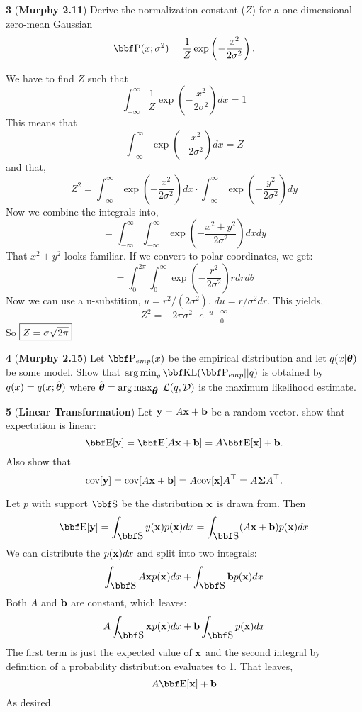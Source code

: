 \documentclass[12pt,letterpaper,fleqn]{hmcpset}
\begin{document}
\newpage

\textbf{3} (\textbf{Murphy 2.11}) Derive the normalization constant ($Z$) for a one dimensional
zero-mean Gaussian
\[
    \PP(x; \sigma^2) = \frac{1}{Z}\exp\left(-\frac{x^2}{2\sigma^2}\right).
\]

\begin{solution}
	We have to find $Z$ such that
	$$\int_{-\infty}^{\infty}\frac{1}{Z}\exp\left(-\frac{x^2}{2\sigma^2}\right)dx = 1$$
	This means that
	$$\int_{-\infty}^{\infty}\exp\left(-\frac{x^2}{2\sigma^2}\right)dx = Z$$
	and that, 
	$$ Z^2 = \int_{-\infty}^{\infty}\exp\left(-\frac{x^2}{2\sigma^2}\right)dx \cdot \int_{-\infty}^{\infty}\exp\left(-\frac{y^2}{2\sigma^2}\right)dy $$
	Now we combine the integrals into,
	$$ = \int_{-\infty}^{\infty}\int_{-\infty}^{\infty}\exp\left(-\frac{x^2+y^2}{2\sigma^2}\right)dxdy $$
	That $x^2 + y^2$ looks familiar. If we convert to polar coordinates, we get:
	$$ = \int_{0}^{2\pi}\int_{0}^{\infty}\exp\left(-\frac{r^2}{2\sigma^2}\right)rdrd\theta $$
	Now we can use a u-substition, $u=r^2/(2\sigma^2)$, $du = r/\sigma^2dr$. This yields,
	$$Z^2 = -2\pi \sigma^2 \left[ e^{-u} \right]_0^\infty$$
	So $\fbox{$Z=\sigma\sqrt{2\pi}$}$
	\end{solution}

\newpage




\textbf{4} (\textbf{Murphy 2.15}) Let $\PP_{emp}(x)$ be the empirical distribution and let
$q(x|\hbox{\boldmath$\theta$})$ be some model. Show that $\argmin_q \KL(\PP_{emp} || q)$ is obtained by
$q(x) = q(x ; \hat{\hbox{\boldmath$\theta$}})$ where $\hat{\hbox{\boldmath$\theta$}} = \operatorname*{arg\,max}_{\hbox{\boldmath$\theta$}} \;{\cal L}(q, {\cal D})$ is
the maximum likelihood estimate.




\newpage

\textbf{5} (\textbf{Linear Transformation}) Let ${\bf y} = A{\bf x} + {\bf b}$ be a random vector.
show that expectation is linear:
\[
    \EE[\yy] = \EE[A\xx + \bb] = A\EE[\xx] + \bb.
\]
Also show that
\[
    {\hbox{cov}}[{\bf y}] = {\hbox{cov}}[A{\bf x} + {\bf b}] = A {\hbox{cov}}[{\bf x}] A^\top = A\hbox{\boldmath$\Sigma$} A^\top.
\]

\vspace{10mm}

Let $p$ with support $\SS$ be the distribution ${\bf x}$ is drawn from. Then
	$$\EE[\yy] = \int_{\SS} y(\xx) p(\xx)dx = \int_{\SS} (A\xx + \bb) p(\xx)dx$$
We can distribute the $p({\bf x})dx$ and split into two integrals:
	$$\int_{\SS} A\xx p(\xx)dx + \int_{\SS} \bb p(\xx)dx$$
Both $A$ and ${\bf b}$ are constant, which leaves:
	$$A \int_{\SS} \xx p(\xx)dx + \bb \int_{\SS}  p(\xx)dx$$
The first term is just the expected value of ${\bf x}$ and the second integral by definition of a probability distribution evaluates to 1. That leaves,
	$$A\EE[\xx] + \bb$$
As desired.\\\\
\end{document}
